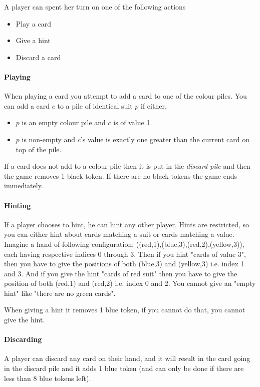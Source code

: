A player can spent her turn on one of the following actions

\begin{itemize}
\item Play a card
\item Give a hint
\item Discard a card
\end{itemize}

\paragraph{Playing}
When playing a card you attempt to add a card to one of the colour piles.
You can add a card $c$ to a pile of identical suit $p$ if either, 

\begin{itemize}	
\item $p$ is an empty colour pile and $c$ is of value 1.
\item $p$ is non-empty and $c$'s value is exactly one greater than the current card on top of the pile.
\end{itemize}

If a card does not add to a colour pile then it is put in the \emph{discard pile} and then the game removes 1 black token. 
If there are no black tokens the game ends immediately.  

\paragraph{Hinting}
If a player chooses to hint, he can hint any other player. 
Hints are restricted, so you can either hint about cards matching a suit or cards matching a value. 
Imagine a hand of following configuration: ((red,1),(blue,3),(red,2),(yellow,3)), each having respective indices 0 through 3. 
Then if you hint "cards of value 3", then you have to give the positions of both (blue,3) and (yellow,3) i.e. index 1 and 3. 
And if you give the hint "cards of red suit" then you have to give the position of both (red,1) and (red,2) i.e. index 0 and 2. 
You cannot give an "empty hint" like "there are no green cards".

When giving a hint it removes 1 blue token, if you cannot do that, you cannot give the hint.

\paragraph{Discarding}
A player can discard any card on their hand, and it will result in the card going in the discard pile and it adds 1 blue token (and can only be done if there are less than 8 blue tokens left).

